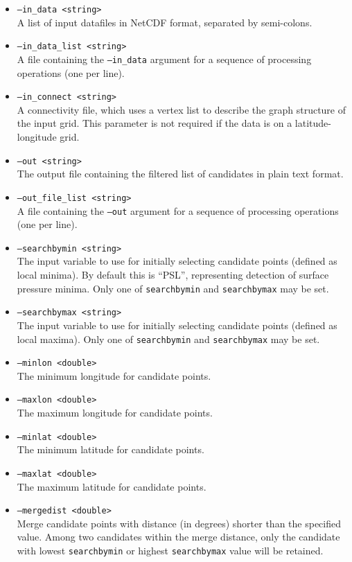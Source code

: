 \documentclass{article}
\begin{document}
\begin{itemize}
\item[] \texttt{--in\_data <string>} \\ A list of input datafiles in NetCDF format, separated by semi-colons.
\item[] \texttt{--in\_data\_list <string>} \\ A file containing the \texttt{--in\_data} argument for a sequence of processing operations (one per line).
\item[] \texttt{--in\_connect <string>} \\ A connectivity file, which uses a vertex list to describe the graph structure of the input grid.  This parameter is not required if the data is on a latitude-longitude grid.
\item[] \texttt{--out <string>} \\ The output file containing the filtered list of candidates in plain text format.
\item[] \texttt{--out\_file\_list <string>} \\ A file containing the \texttt{--out} argument for a sequence of processing operations (one per line).
\item[] \texttt{--searchbymin <string>} \\ The input variable to use for initially selecting candidate points (defined as local minima).  By default this is ``PSL'', representing detection of surface pressure minima.  Only one of \texttt{searchbymin} and \texttt{searchbymax} may be set.
\item[] \texttt{--searchbymax <string>} \\ The input variable to use for initially selecting candidate points (defined as local maxima).  Only one of \texttt{searchbymin} and \texttt{searchbymax} may be set.
\item[] \texttt{--minlon <double>} \\ The minimum longitude for candidate points.
\item[] \texttt{--maxlon <double>} \\ The maximum longitude for candidate points.
\item[] \texttt{--minlat <double>} \\ The minimum latitude for candidate points.
\item[] \texttt{--maxlat <double>} \\ The maximum latitude for candidate points.
\item[] \texttt{--mergedist <double>} \\ Merge candidate points with distance (in degrees) shorter than the specified value.  Among two candidates within the merge distance, only the candidate with lowest \texttt{searchbymin} or highest \texttt{searchbymax} value will be retained. 

\end{itemize}
\end{document}
